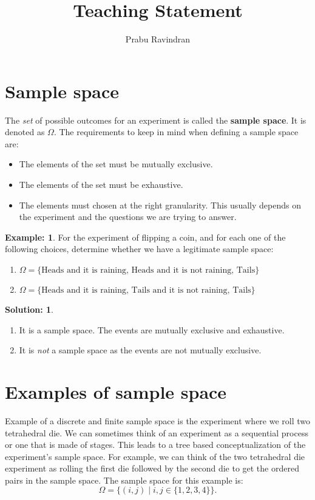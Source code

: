 \documentclass[11pt]{amsart}
\title[]{Teaching Statement}
\author[]{Prabu Ravindran}
\theoremstyle{definition} \newtheorem{thm}{Theorem:} \theoremstyle{plain}
\theoremstyle{definition} \newtheorem*{nnthm}{Theorem:} \theoremstyle{plain}
\theoremstyle{definition} \newtheorem{lem}{Lemma} \theoremstyle{plain}
\theoremstyle{definition} \newtheorem*{nnlem}{Lemma:} \theoremstyle{plain}
\theoremstyle{definition} \newtheorem{prf}{Proof:} \theoremstyle{plain}
\theoremstyle{definition} \newtheorem*{nnprf}{Proof:} \theoremstyle{plain}
\theoremstyle{definition} \newtheorem{eg}{Example:} \theoremstyle{plain}
\theoremstyle{definition} \newtheorem*{sol}{Solution:} \theoremstyle{plain}
\begin{document}
\maketitle
\thispagestyle{empty}

\section{Sample space}
The \emph{set} of possible outcomes for an experiment is called the 
\textbf{sample space}. It is denoted as $\Omega$. The requirements to keep in 
mind when defining a sample space are:
\begin{itemize}
\item The elements of the set must be mutually exclusive. 
\item The elements of the set must be exhaustive.
\item The elements must chosen at the right granularity. This usually 
    depends on the experiment and the questions we are trying to answer. 
\end{itemize}

\begin{eg} 
For the experiment of flipping a coin, and for 
each one of the following choices, determine whether we have a legitimate 
sample space:
\begin{enumerate}
\item
$\Omega = \{\mbox{Heads and it is raining, 
                   Heads and it is not raining, 
                   Tails}\}$
\item
$\Omega = \{\mbox{Heads and it is raining, 
                  Tails and it is not raining, 
                  Tails}\}$ 
\end{enumerate}
\end{eg}
\begin{sol}
\hfill
\begin{enumerate}
\item
It is a sample space. The events are mutually exclusive and exhaustive.
\item
It is \emph{not} a sample space as the events are not mutually exclusive. 
\end{enumerate}
\end{sol} 

\section{Examples of sample space}
Example of a discrete and finite sample space is the experiment where we roll 
two tetrahedral die. We can sometimes think of an experiment as a sequential 
process or one that is made of stages. This leads to a tree based 
conceptualization of the experiment's sample space. For example, we can think 
of the two tetrahedral die experiment as rolling the first die followed by the 
second die to get the ordered pairs in the sample space. The sample space for 
this example is:
\begin{equation*}
\Omega = \{ (i, j) \mid i, j \in \{ 1, 2, 3, 4 \} \}.
\end{equation*}
\end{document}
